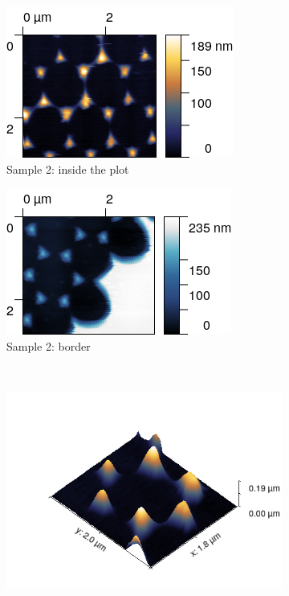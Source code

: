 \documentclass[11pt,a4paper]{article}
\begin{document}
\begin{figure}[H]
\centering
\begin{subfigure}[b]{0.45\textwidth}
\includegraphics[width=\textwidth]{sm_sample2}
\caption{Sample 2: inside the plot}
\label{fig:}
\end{subfigure}
\begin{subfigure}[b]{0.45\textwidth}
\includegraphics[width=\textwidth]{sm_sample2_border}
\caption{Sample 2: border}
\label{fig:}
\end{subfigure}\\\vspace{.2cm}
\begin{subfigure}[b]{0.45\textwidth}
\includegraphics[width=\textwidth]{sm_sample2_3D}

\end{subfigure}
\end{figure}
\end{document}
